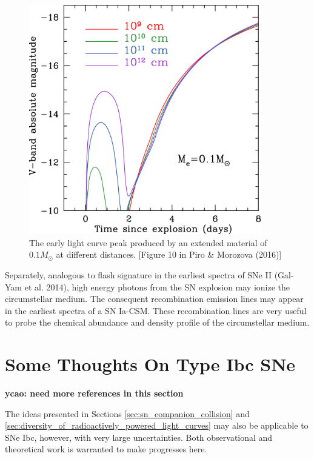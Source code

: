 \documentclass[11pt]{article}
\begin{document}
\begin{figure}[htb]
  \centering
  \includegraphics[width=0.9\textwidth]{extended_material.jpg}
  \caption{The early light curve peak produced by an extended material
    of $0.1M_\odot$ at different distances. [Figure 10 in Piro \&
    Morozova (2016)]}
  \label{fig:extended_material}
\end{figure}

Separately, analogous to flash signature in the earliest spectra of
SNe II (Gal-Yam et al. 2014), high energy photons from the SN
explosion may ionize the circumstellar medium. The consequent
recombination emission lines may appear in the earliest spectra of a
SN Ia-CSM. These recombination lines are very useful to probe the
chemical abundance and density profile of the circumstellar medium.


\section{Some Thoughts On Type Ibc SNe}
\label{sec:thoughts_on_type_ibc_sne}

\textbf{ycao: need more references in this section}

The ideas presented in Sections \ref{sec:sn_companion_collision} and
\ref{sec:diversity_of_radioactively_powered_light_curves} may also be
applicable to SNe Ibc, however, with very large uncertainties. Both
observational and theoretical work is warranted to make progresses
here.
\end{document}
